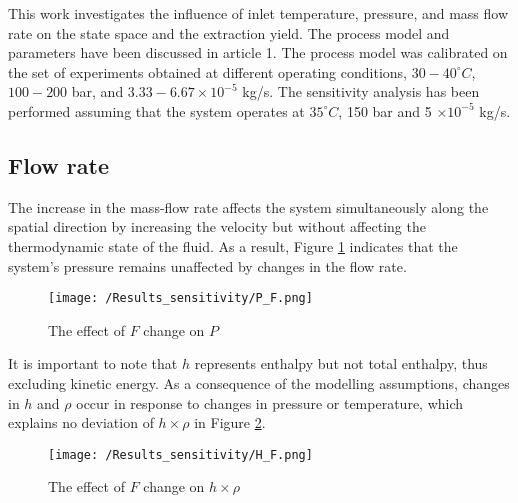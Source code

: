 \documentclass[../Article_Sensitivity_Analsysis.tex]{subfiles}
\begin{document}
	
	\label{CH: Results}
	
	This work investigates the influence of inlet temperature, pressure, and mass flow rate on the state space and the extraction yield. The process model and parameters have been discussed in {\color{red}article 1}. The process model was calibrated on the set of experiments obtained at different operating conditions, $30 - 40^\circ C$, $100 - 200$ bar, and $3.33-6.67 \times 10^{-5}$ kg/s. The sensitivity analysis has been performed assuming that the system operates at $35^\circ C$, 150 bar and 5 $\times 10^{-5}$ kg/s.
	
	\subsection{Flow rate}
	
	The increase in the mass-flow rate affects the system simultaneously along the spatial direction by increasing the velocity but without affecting the thermodynamic state of the fluid. As a result, Figure \ref{fig:Sensitivty_F_P} indicates that the system's pressure remains unaffected by changes in the flow rate.
	
	\begin{figure}[h!]
		\centering
		\texttt{[image: /Results\_sensitivity/P\_F.png]}
		\caption{The effect of $F$ change on $P$}
		\label{fig:Sensitivty_F_P}
	\end{figure}
	
	It is important to note that $h$ represents enthalpy but not total enthalpy, thus excluding kinetic energy. As a consequence of the modelling assumptions, changes in $h$ and $\rho$ occur in response to changes in pressure or temperature, which explains no deviation of $h \times \rho$ in Figure \ref{fig:Sensitivty_F_H}.
    
        
    \begin{figure}[h!]
    	\centering
    	\texttt{[image: /Results\_sensitivity/H\_F.png]}
    	\caption{The effect of $F$ change on $h \times \rho$}
    	\label{fig:Sensitivty_F_H}
    \end{figure}
   
\end{document}
